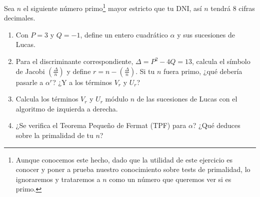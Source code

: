 	Sea $n$ el siguiente número primo\footnote{Aunque conocemos este hecho, dado que la utilidad de este ejercicio
	es conocer y poner a prueba nuestro conocimiento sobre tests de primalidad, lo ignoraremos y trataremos a $n$
	como un número que queremos ver si es primo.} mayor estricto que tu DNI, así $n$ tendrá 8 cifras decimales.
	\begin{enumerate}
		\item Con $P = 3$ y $Q = -1$, define un entero cuadrático $\alpha$ y sus sucesiones de Lucas.
		\item Para el discriminante correspondiente, $\Delta = P^2 - 4Q = 13$, calcula el símbolo de Jacobi
		$\displaystyle \left(\frac{\Delta}{n}\right)$ y define $\displaystyle r = n - \left(\frac{\Delta}{n}\right)$.
		Si tu $n$ fuera primo, ¿qué debería pasarle a $\alpha^r$? ¿Y a los términos $V_r$ y $U_r$?
		\item Calcula los términos $V_r$ y $U_r$ módulo $n$ de las sucesiones de Lucas con el algoritmo de izquierda
		a derecha.
		\item ¿Se verifica el Teorema Pequeño de Fermat (TPF) para $\alpha$? ¿Qué deduces sobre la primalidad de
		tu $n$?
	\end{enumerate}

